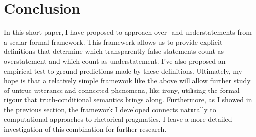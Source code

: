 \documentclass[a4paper,12pt,twoside]{article}
\begin{document}
\section{Conclusion}
\label{sec:orgf60a56f}

In this short paper, I have proposed to approach over- and understatements from a scalar formal framework. This framework allows us to provide explicit definitions that determine which transparently false statements count as overstatement and which count as understatement. I've also proposed an empirical test to ground predictions made by these definitions. Ultimately, my hope is that a relatively simple framework like the above will allow further study of untrue utterance and connected phenomena, like irony, utilising the formal rigour that truth-conditional semantics brings along.
Furthermore, as I showed in the previous section, the framework I developed connects naturally to computational approaches to rhetorical pragmatics. I leave a more detailed investigation of this combination for further research.




\end{document}
